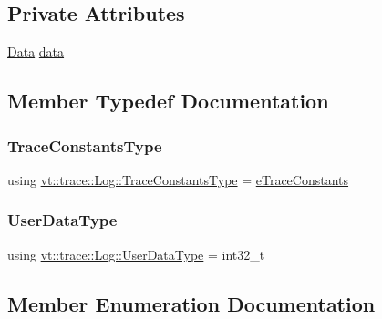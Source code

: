 \subsection*{Private Attributes}
\begin{DoxyCompactItemize}
\item 
\hyperlink{unionvt_1_1trace_1_1_log_1_1_data}{Data} \hyperlink{structvt_1_1trace_1_1_log_ac79b001b6167a37e337bc9d704af8535}{data}
\end{DoxyCompactItemize}


\subsection{Member Typedef Documentation}
\mbox{\label{structvt_1_1trace_1_1_log_a06f69176ce883a9e8a45ffb726fdc558}} 
\subsubsection{\texorpdfstring{Trace\+Constants\+Type}{TraceConstantsType}}
{\footnotesize\ttfamily using \hyperlink{namespacevt_1_1trace_acf454dfbd581b0ebae895f90b5927a1d}{vt\+::trace\+::\+Log\+::\+Trace\+Constants\+Type} =  \hyperlink{namespacevt_1_1trace_acf454dfbd581b0ebae895f90b5927a1d}{e\+Trace\+Constants}}

\mbox{\label{structvt_1_1trace_1_1_log_af392c3825bf45d286a0f77bddf7a96cf}} 
\subsubsection{\texorpdfstring{User\+Data\+Type}{UserDataType}}
{\footnotesize\ttfamily using \hyperlink{structvt_1_1trace_1_1_log_af392c3825bf45d286a0f77bddf7a96cf}{vt\+::trace\+::\+Log\+::\+User\+Data\+Type} =  int32\+\_\+t}



\subsection{Member Enumeration Documentation}
\mbox{\label{structvt_1_1trace_1_1_log_ae1c08093fd18967b7d4912d04d6acc3d}} 
